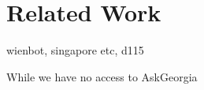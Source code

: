 
\section{Related Work}
wienbot, singapore etc, d115
\todo{

}

While we have no access to AskGeorgia






